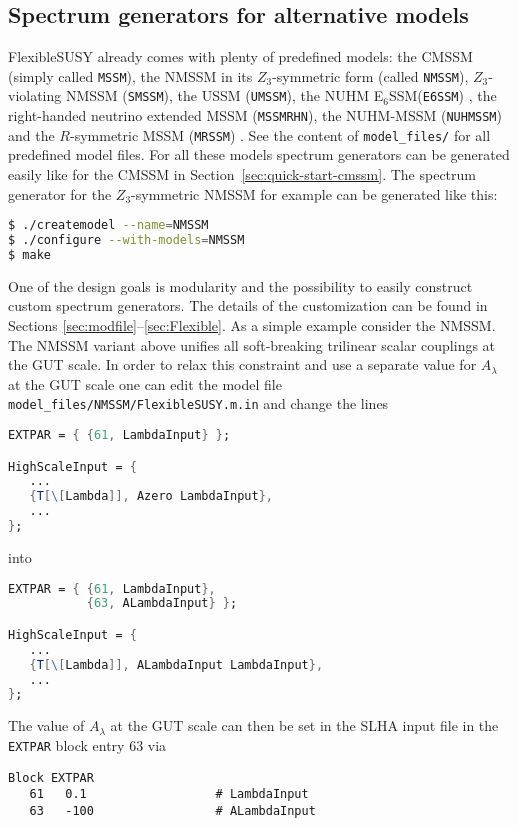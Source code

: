 \documentclass[final,3p,11pt,pdflatex]{elsarticle}
\makeatletter
\newcommand{\fs}{FlexibleSUSY\@\xspace}
\newcommand{\ESSM}{E$_6$SSM\@\xspace}
\newcommand{\code}[1]{\lstinline|#1|}  %
\newcommand{\secref}[1]{Section~\ref{#1}}
\makeatother
\begin{document}
\subsection{Spectrum generators for alternative models}
\label{sec:quick-start-alternative-models}

\fs already comes with plenty of predefined models: the CMSSM (simply
called \code{MSSM}), the NMSSM in its $Z_3$-symmetric form (called \code{NMSSM}), $Z_3$-violating NMSSM (\code{SMSSM}), the USSM (\code{UMSSM}),
the NUHM \ESSM (\code{E6SSM}) \cite{Athron:2007en}, the
right-handed neutrino extended MSSM (\code{MSSMRHN}), the NUHM-MSSM
(\code{NUHMSSM}) and the $R$-symmetric MSSM (\code{MRSSM})
\cite{Kribs:2007ac}.  See the content of \code{model_files/} for all
predefined model files.  For all these models spectrum generators can
be generated easily like for the CMSSM in
\secref{sec:quick-start-cmssm}.  The spectrum generator for the
$Z_3$-symmetric NMSSM for example can be generated like this:
%
\begin{lstlisting}[language=bash]
$ ./createmodel --name=NMSSM
$ ./configure --with-models=NMSSM
$ make
\end{lstlisting}%
%
One of the design goals is modularity and the possibility to easily
construct custom spectrum generators.  The details of the
customization can be found in Sections
\ref{sec:modfile}--\ref{sec:Flexible}.  As a simple example consider
the NMSSM.  The NMSSM variant above unifies all soft-breaking
trilinear scalar couplings at the GUT scale.  In order to relax this
constraint and use a separate value for $A_\lambda$ at the GUT scale
one can edit the model file \code{model_files/NMSSM/FlexibleSUSY.m.in} and
change the lines
%
\begin{lstlisting}[language=Mathematica]
EXTPAR = { {61, LambdaInput} };

HighScaleInput = {
   ...
   {T[\[Lambda]], Azero LambdaInput},
   ...
};
\end{lstlisting}
%
into
%
\begin{lstlisting}[language=Mathematica]
EXTPAR = { {61, LambdaInput},
           {63, ALambdaInput} };

HighScaleInput = {
   ...
   {T[\[Lambda]], ALambdaInput LambdaInput},
   ...
};
\end{lstlisting}
%
The value of $A_\lambda$ at the GUT scale can then be set in the SLHA
input file in the \code{EXTPAR} block entry $63$ via
%
\begin{lstlisting}
Block EXTPAR
   61   0.1                  # LambdaInput
   63   -100                 # ALambdaInput
\end{lstlisting}
\end{document}

